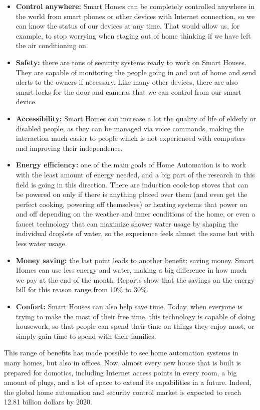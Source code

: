 \begin{itemize}
	\item \textbf{Control anywhere:} Smart Homes can be completely controlled anywhere in the world from smart phones or
	other devices with Internet connection, so we can know the status of our devices at any time. That would allow us, for
	example, to stop worrying when staging out of home thinking if we have left the air conditioning on.
	\item \textbf{Safety:} there are tons of security systems ready to work on Smart Houses. They are capable of monitoring
	the people going in and out of home and send alerts to the owners if necessary. Like many other devices, there are also
	smart locks for the door and cameras that we can control from our smart device.
	\item \textbf{Accessibility:} Smart Homes can increase a lot the quality of life of elderly or disabled people, as they can be
	managed via voice commands, making the interaction much easier to people which is not experienced with computers and
	improving their independence.
	\item \textbf{Energy efficiency:} one of the main goals of Home Automation is to work with the least amount of energy needed,
	and a big part of the research in this field is going in this direction. There are induction cook-top stoves that can be powered on
	only if there is anything placed over them (and even get the perfect cooking, powering off themselves)\cite{directenergyAdvantages}
	or heating systems that power on and off depending on the weather and inner conditions of the home, or even a faucet technology
	that can maximize shower water usage by shaping the individual droplets of water, so the experience feels almost the same but with
	less water usage. 
	\item \textbf{Money saving:} the last point leads to another benefit: saving money. Smart Homes can use less energy and water,
	making a big difference in how much we pay at the end of the month. Reports show that the savings on the energy bill for this 
	reason range from 10\% to 30\%.\cite{directenergyAdvantages}
	\item \textbf{Confort:} Smart Houses can also help save time. Today, when everyone is trying to make the most of their free time, 
	this technology is capable of doing housework, so that people can spend their time on things they enjoy most, or simply gain time 
	to spend with their families.
\end{itemize}

\bigskip
This range of benefits has made possible to see home automation systems in many homes, but also in offices. Now, almost every new
house that is built is prepared for domotics, including Internet access points in every room, a big amount of plugs, and a lot of space 
to extend its capabilities in a future. Indeed, the global home automation and security control market is expected to reach 12.81 billion
dollars by 2020.




